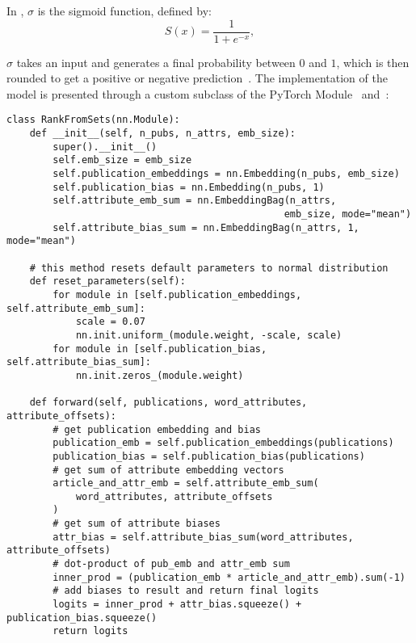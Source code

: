 In , $\sigma$ is the sigmoid function, defined by:
\begin{equation}
\label{eq:sigmoid}
S(x) = \frac{1}{1 + e^{-x}}, 
\end{equation}

$\sigma$ takes an input and generates a final probability between $0$ and $1$, which is then rounded to get a positive or negative prediction~\parencite{svetoslav_2015}. The implementation of the model is presented through a custom subclass of the PyTorch Module~\parencite{NEURIPS2019_9015} and~\parencite{altosaar2020rankfromsets:}:

\begin{verbatim}
class RankFromSets(nn.Module):
    def __init__(self, n_pubs, n_attrs, emb_size):
        super().__init__()
        self.emb_size = emb_size
        self.publication_embeddings = nn.Embedding(n_pubs, emb_size)
        self.publication_bias = nn.Embedding(n_pubs, 1)
        self.attribute_emb_sum = nn.EmbeddingBag(n_attrs,
                                                emb_size, mode="mean")
        self.attribute_bias_sum = nn.EmbeddingBag(n_attrs, 1, mode="mean")

    # this method resets default parameters to normal distribution
    def reset_parameters(self):
        for module in [self.publication_embeddings, self.attribute_emb_sum]:
            scale = 0.07
            nn.init.uniform_(module.weight, -scale, scale)
        for module in [self.publication_bias, self.attribute_bias_sum]:
            nn.init.zeros_(module.weight)

    def forward(self, publications, word_attributes, attribute_offsets):
        # get publication embedding and bias
        publication_emb = self.publication_embeddings(publications)
        publication_bias = self.publication_bias(publications)
        # get sum of attribute embedding vectors
        article_and_attr_emb = self.attribute_emb_sum(
            word_attributes, attribute_offsets
        )
        # get sum of attribute biases
        attr_bias = self.attribute_bias_sum(word_attributes, attribute_offsets)
        # dot-product of pub_emb and attr_emb sum
        inner_prod = (publication_emb * article_and_attr_emb).sum(-1)
        # add biases to result and return final logits
        logits = inner_prod + attr_bias.squeeze() + publication_bias.squeeze()
        return logits
\end{verbatim}
